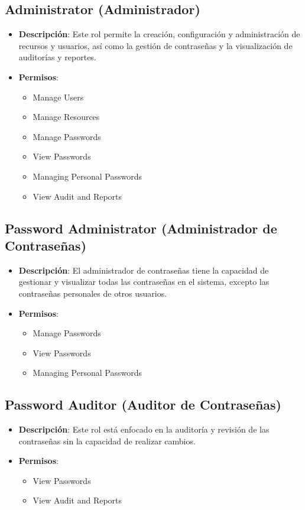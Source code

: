 \subsection{Administrator (Administrador)}
\begin{itemize}
	\item \textbf{Descripción}: Este rol permite la creación, configuración y administración de recursos y usuarios, así como la gestión de contraseñas y la visualización de auditorías y reportes.
	\item \textbf{Permisos}:
	\begin{itemize}
		\item Manage Users
		\item Manage Resources
		\item Manage Passwords
		\item View Passwords
		\item Managing Personal Passwords
		\item View Audit and Reports
	\end{itemize}
\end{itemize}

\subsection{Password Administrator (Administrador de Contraseñas)}
\begin{itemize}
	\item \textbf{Descripción}: El administrador de contraseñas tiene la capacidad de gestionar y visualizar todas las contraseñas en el sistema, excepto las contraseñas personales de otros usuarios.
	\item \textbf{Permisos}:
	\begin{itemize}
		\item Manage Passwords
		\item View Passwords
		\item Managing Personal Passwords
	\end{itemize}
\end{itemize}

\subsection{Password Auditor (Auditor de Contraseñas)}
\begin{itemize}
	\item \textbf{Descripción}: Este rol está enfocado en la auditoría y revisión de las contraseñas sin la capacidad de realizar cambios.
	\item \textbf{Permisos}:
	\begin{itemize}
		\item View Passwords
		\item View Audit and Reports
	\end{itemize}
\end{itemize}

